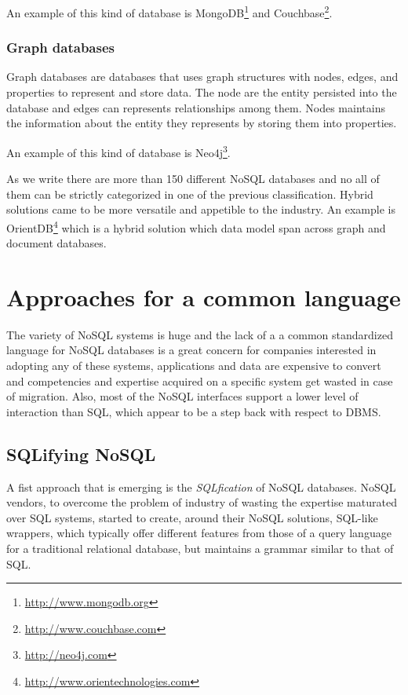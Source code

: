 \noindent An example of this kind of database is MongoDB\footnote{\url{http://www.mongodb.org}} and Couchbase\footnote{\url{http://www.couchbase.com}}.

\subsubsection{Graph databases} 
Graph databases are databases that uses graph structures with nodes, edges, and properties to represent and store data.
The node are the entity persisted into the database and edges can represents relationships among them. Nodes maintains the information about the entity they represents by storing them into properties.

\noindent An example of this kind of database is Neo4j\footnote{\url{http://neo4j.com}}.

\newparagraph As we write there are more than 150 \cite{online:nosql-database.org} different NoSQL databases and no all of them can be strictly categorized in one of the previous classification. Hybrid solutions came to be more versatile and appetible to the industry. An example is OrientDB\footnote{\url{http://www.orientechnologies.com}} which is a hybrid solution which data model span across graph and document databases. 

\section{Approaches for a common language}
\label{sec:common-language}
The variety of NoSQL systems is huge and the lack of a a common standardized language for NoSQL databases is a great concern for companies interested in adopting any of these systems, applications and data are expensive to convert and competencies and expertise acquired on a specific system get wasted in case of migration. 
Also, most of the NoSQL interfaces support a lower level of interaction than SQL, which appear to be a step back with respect to DBMS.

\subsection{SQLifying NoSQL}
A fist approach that is emerging is the \textit{SQLfication} of NoSQL databases.
NoSQL vendors, to overcome the problem of industry of wasting the expertise maturated over SQL systems, started to create, around their NoSQL solutions, SQL-like wrappers,  which typically offer different features from those of a query language for a traditional relational database, but maintains a grammar similar to that of SQL.

